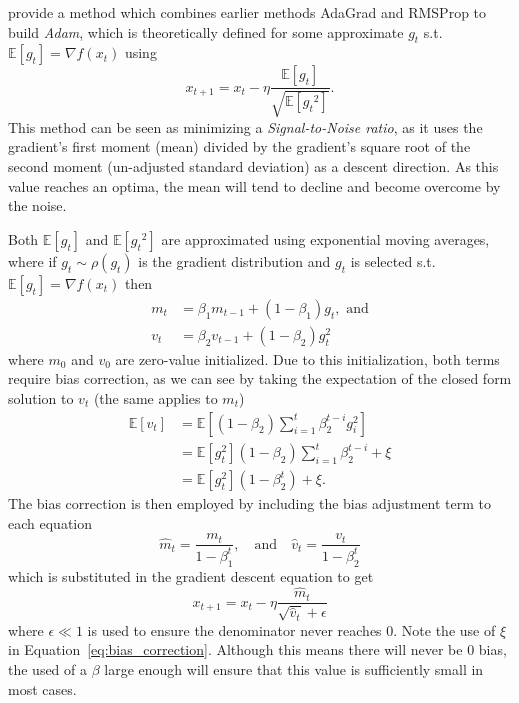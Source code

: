 \documentclass{article}
\newcommand{\E}{\mathbb E}
\theoremstyle{definition}
\begin{document}
\citeauthor{DBLP:journals/corr/KingmaB14} provide a method which combines
earlier methods AdaGrad and RMSProp to build \emph{Adam}, which is theoretically
defined for some approximate $g_t$ s.t. $\E [g_t] = \nabla f(x_t)$ using
\begin{equation}
    x_{t + 1} = x_t - \eta \frac{\E \left[ g_t \right]}{\sqrt{\E \left[
        {g_t}^2  \right] }}.
\end{equation}
This method can be seen as minimizing a \emph{Signal-to-Noise ratio}, as it
uses the gradient's first moment (mean) divided by the gradient's square root of
the second moment (un-adjusted standard deviation) as a descent direction. As
this value reaches an optima, the mean will tend to decline and become overcome
by the noise.

Both $\E \left[ g_t \right]$ and $\E \left[ {g_t}^2
\right]$ are approximated using exponential moving averages, where if $g_t \sim
\rho(g_t)$ is the gradient distribution and $g_t$ is selected s.t. $\E[g_t] =
\nabla f(x_t)$ then
\begin{equation}
    \begin{aligned}
        m_t &= \beta_1 m_{t-1} + (1 - \beta_1)g_{t}, \text{ and} \\
        v_t &= \beta_2 v_{t-1} + (1 - \beta_2)g_{t}^2
    \end{aligned}
\end{equation}
where $m_0$ and $v_0$ are zero-value initialized. Due to this initialization,
both terms require bias correction, as we can see by taking the expectation of
the closed form solution to $v_t$ (the same applies to $m_t$)
\begin{equation}
    \label{eq:bias_correction}
    \begin{aligned}
        \E \left[ v_t \right] &= \E \left[ (1 - \beta_2) \sum_{i = 1}^t
        \beta_2^{t - i} g_i^2 \right] \\
         &= \E \left[g_t^2 \right](1 - \beta_2) \sum_{i = 1}^t
        \beta_2^{t - i} + \xi \\
         &= \E \left[g_t^2 \right](1 - \beta_2^t) + \xi.
    \end{aligned}
\end{equation}
The bias correction is then employed by including the bias adjustment term to
each equation
\begin{equation}
    \hat m_t = \frac{m_t}{1 - \beta_1^t}, \quad \text{and} \quad
    \hat v_t = \frac{v_t}{1 - \beta_2^t}
\end{equation}
which is substituted in the gradient descent equation to get 
\begin{equation}
    x_{t + 1} = x_t - \eta \frac{\hat m_t}{\sqrt{\hat v_t} + \epsilon}
\end{equation}
where $\epsilon \ll 1$ is used to ensure the denominator never reaches 0. Note
the use of $\xi$ in Equation~\ref{eq:bias_correction}. Although this means there
will never be 0 bias, the used of a $\beta$ large enough will ensure that this
value is sufficiently small in most cases.
\end{document}
